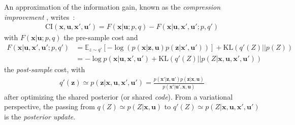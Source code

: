 \documentclass{article}
\begin{document}

An approximation of the information gain, known as the \emph{compression improvement} \cite{schmidhuber2007simple,houthooft2016vime},
writes~:
\begin{align}
\text{CI}(\boldsymbol{x},\boldsymbol{u}, \boldsymbol{x}', \boldsymbol{u}') = F(\boldsymbol{x}|\boldsymbol{u};p,q) - F(\boldsymbol{x}|\boldsymbol{u}, \boldsymbol{x}', \boldsymbol{u}';p,q') 
\end{align}	
with $F(\boldsymbol{x}|\boldsymbol{u};p,q)$ the pre-sample cost and  
\begin{align}
F(\boldsymbol{x}|\boldsymbol{u}, \boldsymbol{x}', \boldsymbol{u}';p,q') &= 
\mathbb{E}_{z\sim q'} \left[-\log (p(\boldsymbol{x}|\boldsymbol{z}, \boldsymbol{u}) p(\boldsymbol{z}|\boldsymbol{x}', \boldsymbol{u}'))\right] +\text{KL}(q'(Z)||p(Z))\label{eq:CI-prior}\\
&= -\log p(\boldsymbol{x}| \boldsymbol{u}, \boldsymbol{x}', \boldsymbol{u}') + \text{KL}(q'(Z)||p(Z|\boldsymbol{x}, \boldsymbol{u}, \boldsymbol{x}', \boldsymbol{u}'))\label{eq:CI-post}
\end{align}
the \emph{post-sample} cost, with 
\begin{align}
q'(\boldsymbol{z}) \simeq p(\boldsymbol{z}|\boldsymbol{x}, \boldsymbol{u}, \boldsymbol{x}', \boldsymbol{u}') = \frac{p(\boldsymbol{x}'|\boldsymbol{z}, \boldsymbol{u}')p(\boldsymbol{z}|\boldsymbol{x}, \boldsymbol{u})}{p(\boldsymbol{x}'|\boldsymbol{u}',\boldsymbol{x},\boldsymbol{u})}
\end{align} 
after optimizing the shared posterior (or shared \emph{code}). From a variational perspective, the passing from $q(Z) \simeq p(Z|\boldsymbol{x}, \boldsymbol{u})$ to $q'(Z) \simeq p(Z|\boldsymbol{x}, \boldsymbol{u}, \boldsymbol{x}', \boldsymbol{u}')$ is the \emph{posterior update}.
\end{document}
